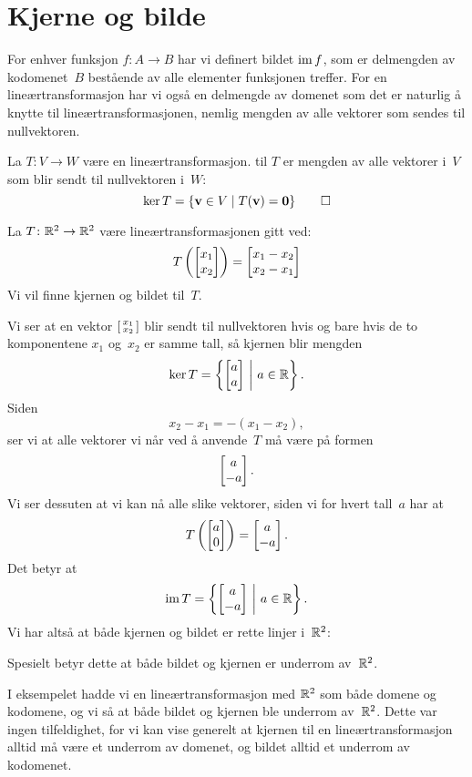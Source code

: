\section*{Kjerne og bilde}

For enhver funksjon $f \colon A \to B$ har vi definert bildet $\operatorname{im} f$,
som er delmengden av kodomenet~$B$ bestående av alle elementer
funksjonen treffer.  For en lineærtransformasjon har vi også en
delmengde av domenet som det er naturlig å knytte til
lineærtransformasjonen, nemlig mengden av alle vektorer som sendes til
nullvektoren.

\begin{defn}
La $T \colon V \to W$ være en lineærtransformasjon.  
til $T$ er mengden av alle vektorer i~$V$ som blir sendt til
nullvektoren i~$W$:
\[
\ker T = \{ \mathbf{v} \in V \mid T(\mathbf{v}) = \mathbf{0} \}\qedhere
\]
\end{defn}

\begin{ex}
La $T \colon \mathbb{R}^2 \to \mathbb{R}^2$ være lineærtransformasjonen gitt ved:
\[
T \left( \begin{bmatrix} x_1 \\ x_2 \end{bmatrix} \right) = \begin{bmatrix} x_1-x_2 \\ x_2-x_1 \end{bmatrix}
\]
Vi vil finne kjernen og bildet til~$T$.

Vi ser at en vektor $\left[ \begin{smallmatrix} x_1 \\ x_2 \end{smallmatrix} \right]$ blir sendt til nullvektoren hvis
og bare hvis de to komponentene $x_1$ og~$x_2$ er samme tall, så
kjernen blir mengden
\[
\ker T = \left\{ \begin{bmatrix} a \\ a \end{bmatrix}\ \middle|\ a \in \mathbb{R} \right\}.
\]
Siden
\[
x_2 - x_1 = - (x_1 - x_2),
\]
ser vi at alle vektorer vi når ved å anvende~$T$ må være på formen
\[
\begin{bmatrix} a \\ -a \end{bmatrix}.
\]
Vi ser dessuten at vi kan nå alle slike vektorer, siden vi for hvert
tall~$a$ har at
\[
T \left( \begin{bmatrix} a \\ 0 \end{bmatrix} \right) = \begin{bmatrix} a \\ -a \end{bmatrix}.
\]
Det betyr at
\[
\operatorname{im} T = \left\{ \begin{bmatrix} a \\ -a \end{bmatrix}\ \middle|\ a \in \mathbb{R} \right\}.
\]
Vi har altså at både kjernen og bildet er rette linjer i~$\mathbb{R}^2$:
\begin{center}
\end{center}
Spesielt betyr dette at både bildet og kjernen er underrom av~$\mathbb{R}^2$.
\end{ex}

I eksempelet hadde vi en lineærtransformasjon med $\mathbb{R}^2$ som både
domene og kodomene, og vi så at både bildet og kjernen ble underrom
av~$\mathbb{R}^2$.  Dette var ingen tilfeldighet, for vi kan vise generelt at
kjernen til en lineærtransformasjon alltid må være et underrom av
domenet, og bildet alltid et underrom av kodomenet.

